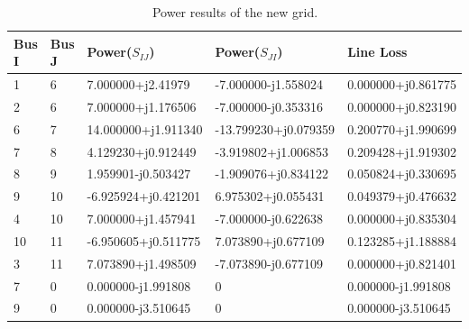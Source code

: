\documentclass[conference]{IEEEtran}
\begin{document}
\begin{table}[ht]
	\begin{center}
		\begin{tabular}{|l|l|l|l|l|}
			\hline
			Bus I & Bus J & Power($S_{IJ}$) & Power($S_{JI}$) & Line Loss \\ \hline
			1 & 6 & 7.000000+j2.41979 & -7.000000-j1.558024 & 0.000000+j0.861775 \\ \hline
			2 & 6 & 7.000000+j1.176506 & -7.000000-j0.353316 & 0.000000+j0.823190 \\ \hline
			6 & 7 & 14.000000+j1.911340 & -13.799230+j0.079359 & 0.200770+j1.990699 \\ \hline
			7 & 8 & 4.129230+j0.912449 & -3.919802+j1.006853 & 0.209428+j1.919302 \\ \hline
			8 & 9 & 1.959901-j0.503427 & -1.909076+j0.834122 & 0.050824+j0.330695 \\ \hline
			9 & 10 & -6.925924+j0.421201 & 6.975302+j0.055431 & 0.049379+j0.476632 \\ \hline
			4 & 10 & 7.000000+j1.457941 & -7.000000-j0.622638 & 0.000000+j0.835304 \\ \hline
			10 & 11 & -6.950605+j0.511775 & 7.073890+j0.677109 & 0.123285+j1.188884 \\ \hline
			3 & 11 & 7.073890+j1.498509 & -7.073890-j0.677109 & 0.000000+j0.821401 \\ \hline
			7 & 0 & 0.000000-j1.991808 & 0 & 0.000000-j1.991808 \\ \hline
			9 & 0 & 0.000000-j3.510645 & 0 & 0.000000-j3.510645 \\ \hline
		\end{tabular}
	\end{center}
	\caption{Power results of the new grid.}
	\vspace{-8mm}
	\label{tab:s2}
\end{table}
\end{document}
